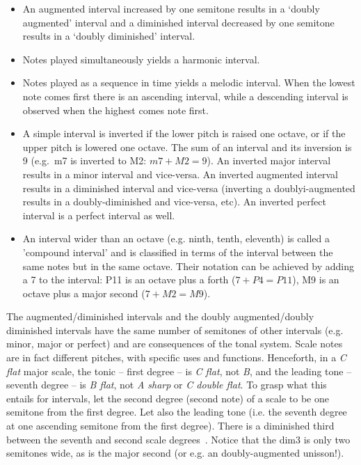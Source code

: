 \begin{itemize}
	\item An augmented interval increased by one semitone results in a `doubly augmented' interval and a diminished interval decreased by one semitone results in a `doubly diminished' interval.
	\item Notes played simultaneously yields a harmonic interval.
	\item Notes played as a sequence in time yields a
                melodic interval.  When the lowest note comes first there is an ascending interval, while a descending interval is observed when the highest comes note first. 
	\item A simple interval is inverted if the lower pitch is raised one octave, or if
                the upper pitch is lowered one octave. The sum of an interval and its inversion is
                9 (e.g.\ m7 is inverted to M2: $m7+M2=9$). An inverted major
                interval results in a minor interval and vice-versa. An
                inverted augmented interval results in a diminished interval
                and vice-versa (inverting a doublyi-augmented results in a
                doubly-diminished and vice-versa, etc).
                An inverted perfect interval is a perfect interval as well.
	\item An interval wider than an octave (e.g. ninth, tenth, eleventh) is called a 'compound interval' and is classified in terms of the interval between the same notes but in the same octave. Their notation can be achieved by adding a
                7 to the interval: P11 is an octave plus a forth ($7 + P4 = P11$), M9 is an octave plus a major second ($7 + M2 = M9$).
\end{itemize}

The augmented/diminished intervals and the doubly augmented/doubly diminished intervals have the same number of semitones of other intervals (e.g. minor, major or perfect) and are consequences of the tonal system.
Scale notes are in fact different pitches, with specific uses and functions. Henceforth, in a \textit{C flat} major scale, the tonic -- first degree -- is \textit{C flat}, not \textit{B}, and the leading tone -- seventh degree -- is \textit{B flat}, not \textit{A sharp} or \textit{C double flat}.
To grasp what this entails for intervals, let the second degree (second note) of a scale to be one semitone from the first degree. Let also the leading tone (i.e. the seventh degree at one ascending semitone from the first degree). There is a diminished third between the seventh and second scale degrees~\cite{Lacerda}.
Notice that the dim3 is only two semitones wide, as is the major second (or e.g. an doubly-augmented unisson!).

